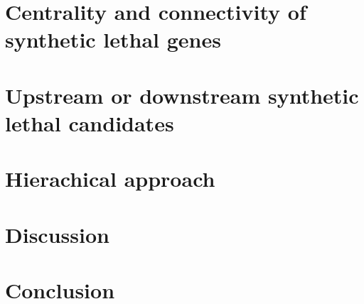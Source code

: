\section{Centrality and connectivity of synthetic lethal genes}

\section{Upstream or downstream synthetic lethal candidates}

\section{Hierachical approach}

\section{Discussion}

\section{Conclusion}